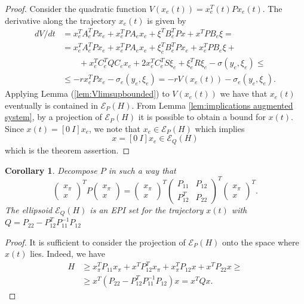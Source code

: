 \documentclass[letterpaper,10pt,conference,twocolumn]{IEEEtran}
\newtheorem{cor}[thm]{Corollary}
\newcommand{\ellips}{\mathcal{E}}
\begin{document}
\begin{proof}
	Consider the quadratic function	$V(x_e(t))=x_e^T(t)Px_e(t)$.
	The derivative along the trajectory $x_e(t)$ is given by
	\begin{align*}
		dV/dt&=x_e^TA_e^TPx_e+x_e^TPA_e x_e+\xi^T B_e^T Px + x^T P B_e\xi=\\
	&=x_e^TA_e^TPx_e+x_e^TPA_ex_e+\xi_e^T B_e^T Px_e + x_e^T P B_e\xi+\\
	&\qquad +x_e^TC_e^TQC_ex_e+2x_e^TC_e^TS\xi_e+\xi_e^TR\xi_e-\sigma(y_e,\xi_e)\leq\\
	&\leq -r x_e^TPx_e -\sigma_e(y_e,\xi_e) = -r V(x_e(t)) -\sigma_e(y_e,\xi_e).
	\end{align*}
	Applying Lemma (\ref{lem:Vlimsupbounded}) to $V(x_e(t))$ we have that $x_e(t)$ eventually is contained in $\ellips_{P}(H)$. From Lemma \ref{lem:implications augmented system},  by a projection of $\ellips_{P}(H)$ it is possible to obtain a bound for $x(t)$. Since $x(t)=[0~I]x_e$, we note that $x_e \in \ellips_{P}(H)$ which implies 
	\begin{equation*}
		x=[0~I]x_e \in \ellips_{Q}(H)
	\end{equation*}
	which is the theorem assertion.
\end{proof}
\begin{cor}
	Decompose $P$ in such a way that
	\begin{equation*}
		\left(\begin{array}{c}
			x_{\pi}\\ x
		\end{array}\right)^T
		P
		\left(\begin{array}{c}
			x_{\pi}\\ x
		\end{array}\right)=
% 
		\left(\begin{array}{c}
			x_{\pi}\\ x
		\end{array}\right)^T
%
		\left(\begin{array}{cc}
			P_{11} & P_{12}\\
			P_{12}^T & P_{22}
		\end{array}\right)^T
%
		\left(\begin{array}{c}
			x_{\pi}\\ x
		\end{array}\right)^T.
	\end{equation*}
	The ellipsoid $\ellips_{Q}(H)$ is an EPI set for the trajectory $x(t)$ with $Q=P_{22}-P_{12}^T P_{11}^{-1}P_{12}$
\end{cor}
\begin{proof}
	It is sufficient to consider the projection of $\ellips_{P}(H)$ onto the space where $x(t)$ lies.
	Indeed, we have
	\begin{align*}
		H&\geq x_{\pi}^T P_{11} x_{\pi}+x^TP_{12}^T x_{\pi}+x_{\pi}^TP_{12}x+x^TP_{22}x\geq \\
		&\geq x^T(P_{22}-P_{12}^TP_{11}^{-1}P_{12})x = x^T Q x.
	\end{align*}
\end{proof}
\end{document}
